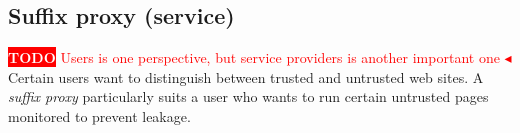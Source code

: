 \documentclass{llncs}
\newcommand{\todo}[1]{\colorbox{red}{\textcolor{white}{\sffamily\bfseries\scriptsize TODO}} \textcolor{red}{#1} \textcolor{red}{$\blacktriangleleft$}}
\begin{document}
\subsection{Suffix proxy (service)}

\todo{Users is one perspective, but  service providers is another
  important one}
Certain users want to distinguish between trusted and untrusted web sites.
A \emph{suffix proxy} particularly suits a user who wants to run certain untrusted 
pages monitored to prevent leakage.
\end{document}
